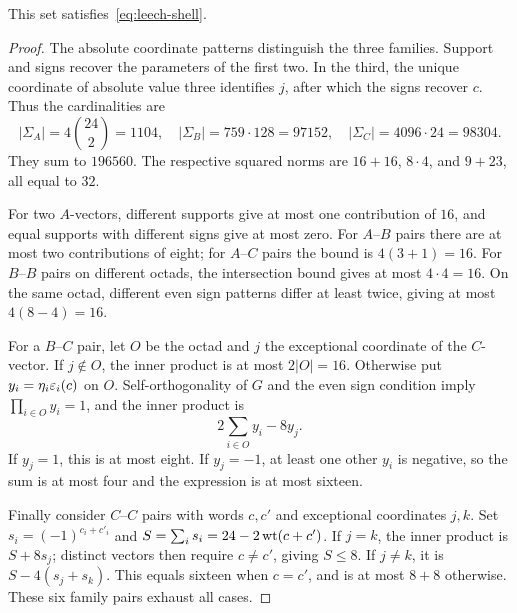 \begin{lemma}\label{lem:shell}
This set satisfies~\eqref{eq:leech-shell}.
\end{lemma}
\begin{proof}
The absolute coordinate patterns distinguish the three families.
Support and signs recover the parameters of the first two. In the
third, the unique coordinate of absolute value three identifies $j$,
after which the signs recover $c$. Thus the cardinalities are
\[
 |\Sigma_A|=4\binom{24}{2}=1104,\quad
 |\Sigma_B|=759\cdot128=97152,\quad
 |\Sigma_C|=4096\cdot24=98304.
\]
They sum to $196560$. The respective squared norms are
$16+16$, $8\cdot4$, and $9+23$, all equal to $32$.

For two $A$-vectors, different supports give at most one contribution
of $16$, and equal supports with different signs give at most zero.
For $A$--$B$ pairs there are at most two contributions of eight;
for $A$--$C$ pairs the bound is $4(3+1)=16$.
For $B$--$B$ pairs on different octads, the intersection bound gives
at most $4\cdot4=16$. On the same octad, different even sign patterns
differ at least twice, giving at most $4(8-4)=16$.

For a $B$--$C$ pair, let $O$ be the octad and $j$ the exceptional
coordinate of the $C$-vector. If $j\notin O$, the inner product is
at most $2|O|=16$. Otherwise put $y_i=\eta_i\varepsilon_i(c)$ on $O$.
Self-orthogonality of $G$ and the even sign condition imply
$\prod_{i\in O}y_i=1$, and the inner product is
\[
 2\sum_{i\in O}y_i-8y_j.
\]
If $y_j=1$, this is at most eight. If $y_j=-1$, at least one other
$y_i$ is negative, so the sum is at most four and the expression is
at most sixteen.

Finally consider $C$--$C$ pairs with words $c,c'$ and exceptional
coordinates $j,k$. Set $s_i=(-1)^{c_i+c'_i}$ and
$S=\sum_i s_i=24-2\operatorname{wt}(c+c')$. If $j=k$, the inner product is
$S+8s_j$; distinct vectors then require $c\ne c'$, giving $S\le8$.
If $j\ne k$, it is $S-4(s_j+s_k)$. This equals sixteen when
$c=c'$, and is at most $8+8$ otherwise. These six family pairs
exhaust all cases.
\end{proof}

\begin{table}[ht]
\centering\small
\caption{A binary generator for the Golay code in~\eqref{eq:golay}.
Coordinates run from zero to $23$ from left to right.}
\label{tab:golay}

\end{table}

